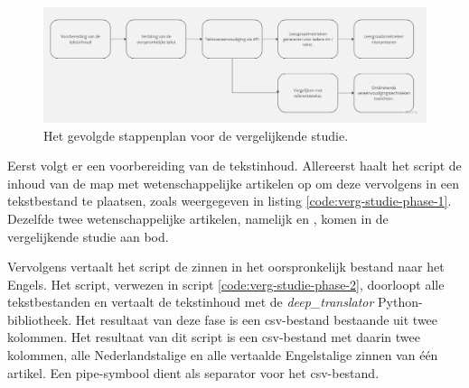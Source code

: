 \begin{figure}
\includegraphics[width=\linewidth]{img/flowchart-vergelijkende-studie.jpg}
\caption{Het gevolgde stappenplan voor de vergelijkende studie.}
\label{img:flowchart-vergelijkende-studie-metrics}
\end{figure}

\medspace

Eerst volgt er een voorbereiding van de tekstinhoud. Allereerst haalt het script de inhoud van de map met wetenschappelijke artikelen op om deze vervolgens in een tekstbestand te plaatsen, zoals weergegeven in listing \ref{code:verg-studie-phase-1}. Dezelfde twee wetenschappelijke artikelen, namelijk \textcite{Sleuwaegen2022} en \textcite{VanBrakel2022}, komen in de vergelijkende studie aan bod.

\medspace

Vervolgens vertaalt het script de zinnen in het oorspronkelijk bestand naar het Engels. Het script, verwezen in script \ref{code:verg-studie-phase-2}, doorloopt alle tekstbestanden en vertaalt de tekstinhoud met de \textit{deep\_translator} Python-bibliotheek. Het resultaat van deze fase is een csv-bestand bestaande uit twee kolommen. Het resultaat van dit script is een csv-bestand met daarin twee kolommen, alle Nederlandstalige en alle vertaalde Engelstalige zinnen van één artikel. Een pipe-symbool dient als separator voor het csv-bestand.

\medspace

